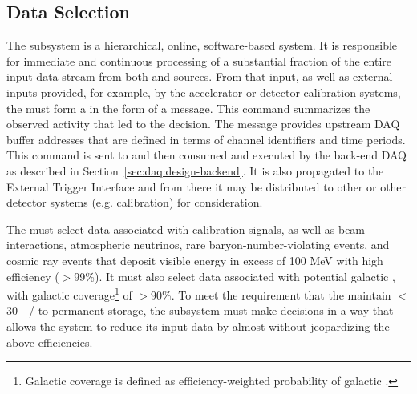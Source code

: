 \subsection{Data Selection}
\label{sec:daq:design-data-selection}

The  subsystem is a hierarchical, online, software-based system.
It is responsible for immediate and continuous processing of a substantial
fraction of the entire input data stream from both  and 
sources.
From that input, as well as external inputs provided, for example, by the
accelerator or detector calibration systems, the  must form a
 in the form of a  message.
This command summarizes the observed activity that led to the decision. 
The message provides upstream DAQ buffer addresses that are defined in terms of
channel identifiers and time periods.
This command is sent to and then consumed and executed by the back-end DAQ as
described in Section~\ref{sec:daq:design-backend}. 
It is also propagated to the External Trigger Interface and from there it may be
distributed to other  or other detector systems
(e.g. calibration) for consideration.

The  must select data associated with calibration signals, as well
as beam interactions, atmospheric neutrinos, rare baryon-number-violating
events, and cosmic ray events that deposit visible energy in excess of 100 MeV
with high efficiency ($>$99\%). 
It must also select data associated with potential galactic , with
galactic coverage\footnote{Galactic coverage is defined as efficiency-weighted
  probability of galactic .} of $>$90\%.
To meet the requirement that the   maintain
$<$\SI{30}{\peta\byte/\year} to permanent storage, the  subsystem
must make  decisions in a way that allows the  system
to reduce its input data by almost without jeopardizing
the above efficiencies.

